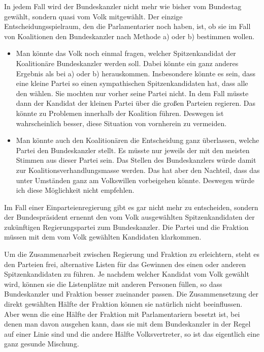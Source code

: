 In jedem Fall wird der Bundeskanzler nicht mehr wie bisher vom Bundestag gewählt, sondern quasi vom Volk mitgewählt.
Der
einzige Entscheidungsspielraum, den die Parlamentarier noch haben, ist, ob sie im Fall von Koalitionen den Bundeskanzler nach
Methode a) oder b) bestimmen wollen.


\begin{itemize}
  \item Man könnte das Volk noch einmal fragen, welcher Spitzenkandidat der Koalitionäre Bundeskanzler werden soll. Dabei
    könnte ein ganz anderes Ergebnis als bei a) oder b) herauskommen. Insbesondere könnte es sein, dass eine kleine Partei
    so einen sympathischen Spitzenkandidaten hat, dass alle den wählen. Sie mochten nur vorher seine Partei nicht. In dem
    Fall müsste dann der Kandidat der kleinen Partei über die großen Parteien regieren. Das könnte zu Problemen innerhalb
    der Koalition führen. Deswegen ist wahrscheinlich besser, diese Situation von vornherein zu vermeiden.
  \item Man könnte auch den Koalitionären die Entscheidung ganz überlassen, welche Partei den Bundeskanzler stellt. Es müsste
    nur jeweils der mit den meisten Stimmen aus dieser Partei sein. Das Stellen des Bundeskanzlers würde damit zur
    Koalitionsverhandlungsmasse werden.
    Das hat aber den Nachteil, dass das unter Umständen ganz am Volkswillen vorbeigehen könnte.
    Deswegen würde ich diese Möglichkeit nicht empfehlen.
\end{itemize}

Im Fall einer Einparteienregierung gibt es gar nicht mehr zu entscheiden, sondern der Bundespräsident ernennt den vom
Volk ausgewählten Spitzenkandidaten der zukünftigen Regierungspartei zum Bundeskanzler. Die Partei und die Fraktion müssen
mit dem vom Volk gewählten Kandidaten klarkommen.

Um die Zusammenarbeit zwischen Regierung und Fraktion zu erleichtern, steht
es den Parteien frei, alternative Listen für das Gewinnen des einen oder anderen Spitzenkandidaten zu führen.
Je nachdem welcher Kandidat vom Volk gewählt wird, können sie die Listenplätze mit anderen Personen füllen, so dass Bundeskanzler
und Fraktion besser zueinander passen.
Die Zusammensetzung der direkt gewählten Hälfte der Fraktion können sie natürlich nicht beeinflussen.
Aber wenn die eine Hälfte der Fraktion mit Parlamentariern besetzt ist, bei denen man davon ausgehen kann, dass sie mit
dem Bundeskanzler in der Regel auf einer Linie sind und die andere Hälfte Volksvertreter, so ist das eigentlich eine ganz
gesunde Mischung.

